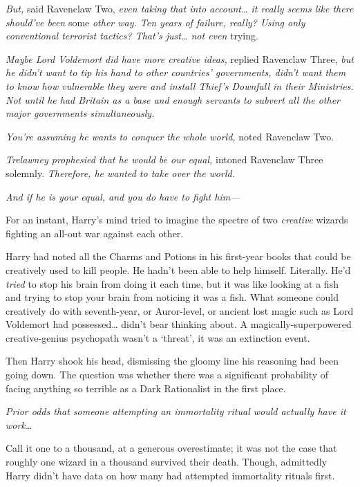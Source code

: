 \emph{But,} said Ravenclaw Two, \emph{even taking that into account{\ldots} it really seems like there should've been} some \emph{other way. Ten years of failure, really? Using only conventional terrorist tactics? That's just{\ldots} not even} trying.

\emph{Maybe Lord Voldemort did have more creative ideas,} replied Ravenclaw Three, \emph{but he didn't want to tip his hand to \emph{other} countries' governments, didn't want \emph{them} to know how vulnerable they were and install Thief's Downfall in \emph{their} Ministries. Not until he had Britain as a base and enough servants to subvert \emph{all} the other major governments simultaneously.}

\emph{You're assuming he wants to conquer the whole world,} noted Ravenclaw Two.

\emph{Trelawney prophesied that he would be our equal,} intoned Ravenclaw Three solemnly. \emph{Therefore, he wanted to take over the world.}

\emph{And if he is your equal, and you do have to fight him—}

For an instant, Harry's mind tried to imagine the spectre of two \emph{creative} wizards fighting an all-out war against each other.

Harry had noted all the Charms and Potions in his first-year books that could be creatively used to kill people. He hadn't been able to help himself. Literally. He'd \emph{tried} to stop his brain from doing it each time, but it was like looking at a fish and trying to stop your brain from noticing it was a fish. What someone could creatively do with seventh-year, or Auror-level, or ancient lost magic such as Lord Voldemort had possessed{\ldots} didn't bear thinking about. A magically-superpowered creative-genius psychopath wasn't a `threat', it was an extinction event.

Then Harry shook his head, dismissing the gloomy line his reasoning had been going down. The question was whether there was a significant probability of facing anything so terrible as a Dark Rationalist in the first place.

\emph{Prior odds that someone attempting an immortality ritual would actually have it work{\ldots}}

Call it one to a thousand, at a generous overestimate; it was not the case that roughly one wizard in a thousand survived their death. Though, admittedly Harry didn't have data on how many had attempted immortality rituals first.

